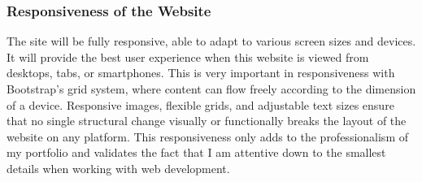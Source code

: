 \documentclass[a4paper,12pt]{article}
\begin{document}
\subsubsection{Responsiveness of the Website}
The site will be fully responsive, able to adapt to various screen sizes and devices. It will provide the best user experience when this website is viewed from desktops, tabs, or smartphones. This is very important in responsiveness with Bootstrap's grid system, where content can flow freely according to the dimension of a device. Responsive images, flexible grids, and adjustable text sizes ensure that no single structural change visually or functionally breaks the layout of the website on any platform. This responsiveness only adds to the professionalism of my portfolio and validates the fact that I am attentive down to the smallest details when working with web development.

\end{document}
